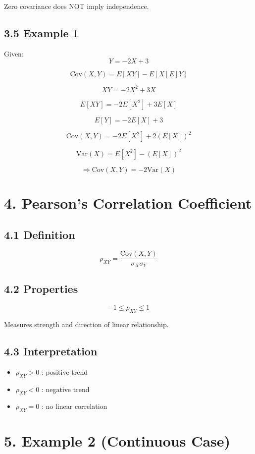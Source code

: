\documentclass[12pt]{article}
\begin{document}
Zero covariance does NOT imply independence.

\subsection*{3.5 Example 1}

Given:
\[
Y = -2X + 3
\]

\[
\text{Cov}(X,Y) = E[XY] - E[X]E[Y]
\]

\[
XY = -2X^2 + 3X
\]

\[
E[XY] = -2E[X^2] + 3E[X]
\]

\[
E[Y] = -2E[X] + 3
\]

\[
\text{Cov}(X,Y) = -2E[X^2] + 2(E[X])^2
\]

\[
\text{Var}(X) = E[X^2] - (E[X])^2
\]

\[
\Rightarrow \text{Cov}(X,Y) = -2\text{Var}(X)
\]

\section*{4. Pearson’s Correlation Coefficient}

\subsection*{4.1 Definition}

\[
\rho_{XY} = \frac{\text{Cov}(X,Y)}{\sigma_X \sigma_Y}
\]

\subsection*{4.2 Properties}

\[
-1 \leq \rho_{XY} \leq 1
\]

Measures strength and direction of linear relationship.

\subsection*{4.3 Interpretation}

\begin{itemize}
    \item $\rho_{XY} > 0$ : positive trend
    \item $\rho_{XY} < 0$ : negative trend
    \item $\rho_{XY} = 0$ : no linear correlation
\end{itemize}

\section*{5. Example 2 (Continuous Case)}
\end{document}
